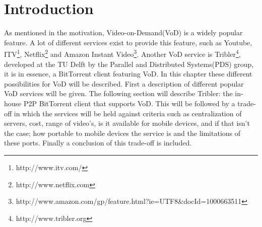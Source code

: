 \section{Introduction}
As mentioned in the motivation, Video-on-Demand(VoD) is a widely popular feature. A lot of different services exist to provide this feature, such as Youtube, ITV\footnote{http://www.itv.com/}, Netflix\footnote{http://www.netflix.com} and Amazon Instant Video\footnote{http://www.amazon.com/gp/feature.html?ie=UTF8\&docId=1000663511}. Another VoD service is Tribler\footnote{http://www.tribler.org}, developed at the TU Delft by the Parallel and Distributed Systems(PDS) group, it is in essence, a BitTorrent client featuring VoD. In this chapter these different possibilities for VoD will be described. First a description of different popular VoD services will be given. The following section will describe Tribler: the in-house P2P BitTorrent client that supports VoD. This will be followed by a trade-off in which the services will be held against criteria such as centralization of servers, cost, range of video's, is it available for mobile devices, and if that isn't the case; how portable to mobile devices the service is and the limitations of these ports. Finally a conclusion of this trade-off is included.